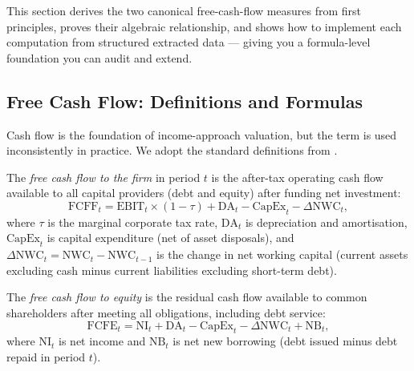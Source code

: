 \begin{deepdive}
This section derives the two canonical free-cash-flow measures from first principles,
proves their algebraic relationship, and shows how to implement each computation from
structured extracted data — giving you a formula-level foundation you can audit and
extend.

\subsection{Free Cash Flow: Definitions and Formulas}
\label{subsec:bv-cashflows-definitions}

Cash flow is the foundation of income-approach valuation, but the term is used
inconsistently in practice. We adopt the standard definitions from
\citet{damodaran2012investment}.

\begin{definition}
\label{def:fcff}
The \emph{free cash flow to the firm} in period $t$ is the after-tax operating cash flow
available to all capital providers (debt and equity) after funding net investment:
\begin{equation}
\label{eq:fcff}
\mathrm{FCFF}_t = \mathrm{EBIT}_t \times (1 - \tau)
                + \mathrm{DA}_t
                - \mathrm{CapEx}_t
                - \Delta\mathrm{NWC}_t,
\end{equation}
where $\tau$ is the marginal corporate tax rate, $\mathrm{DA}_t$ is depreciation
and amortisation, $\mathrm{CapEx}_t$ is capital expenditure (net of asset disposals),
and $\Delta\mathrm{NWC}_t = \mathrm{NWC}_t - \mathrm{NWC}_{t-1}$ is the change in
net working capital (current assets excluding cash minus current liabilities excluding
short-term debt).
\end{definition}

\begin{definition}
\label{def:fcfe}
The \emph{free cash flow to equity} is the residual cash flow available to common
shareholders after meeting all obligations, including debt service:
\begin{equation}
\label{eq:fcfe}
\mathrm{FCFE}_t = \mathrm{NI}_t + \mathrm{DA}_t
                - \mathrm{CapEx}_t
                - \Delta\mathrm{NWC}_t
                + \mathrm{NB}_t,
\end{equation}
where $\mathrm{NI}_t$ is net income and $\mathrm{NB}_t$ is net new borrowing (debt
issued minus debt repaid in period $t$).
\end{definition}


\end{deepdive}
